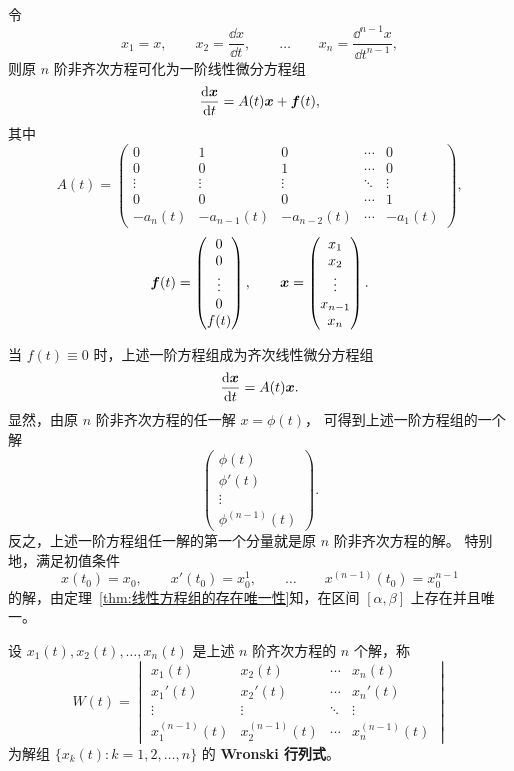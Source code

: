令
\[
	x_1=x,
	\qquad
	x_2=\dfrac{\dd x}{\dd t},
	\qquad\ldots\qquad
	x_n=\dfrac{\dd^{n-1}x}{\dd t^{n-1}},
\]
则原 $n$ 阶非齐次方程可化为一阶线性微分方程组
\[
	\dfrac{\mathrm{d}\boldsymbol{x}}{\mathrm{d} t}
	=A(t)\boldsymbol{x}+\boldsymbol{f}(t),
\]
其中
\[
	A(t)=
	\begin{pmatrix}
		0       & 1          & 0          & \cdots & 0\\
		0       & 0          & 1          & \cdots & 0\\
		\vdots  & \vdots     & \vdots     & \ddots & \vdots\\
		0       & 0          & 0          & \cdots & 1\\
		-a_n(t) & -a_{n-1}(t)& -a_{n-2}(t)& \cdots & -a_1(t)
	\end{pmatrix},
\]
\[
	\boldsymbol{f}(t)=
	\begin{pmatrix}
		0\\
		0\\
		\vdots\\
		0\\
		f(t)
	\end{pmatrix},
	\qquad
	\boldsymbol{x}=
	\begin{pmatrix}
		x_1\\
		x_2\\
		\vdots\\
		x_{n-1}\\
		x_n
	\end{pmatrix}.
\]

当 $f(t)\equiv 0$ 时，上述一阶方程组成为齐次线性微分方程组
\[
	\dfrac{\mathrm{d}\boldsymbol{x}}{\mathrm{d} t}=A(t)\boldsymbol{x}.
\]
显然，由原 $n$ 阶非齐次方程的任一解 $x=\phi(t)$，
可得到上述一阶方程组的一个解
\[
	\begin{pmatrix}
		\phi(t)\\
		\phi'(t)\\
		\vdots\\
		\phi^{(n-1)}(t)
	\end{pmatrix}.
\]
反之，上述一阶方程组任一解的第一个分量就是原 $n$ 阶非齐次方程的解。
特别地，满足初值条件
\[
	x(t_0)=x_0,
	\qquad
	x'(t_0)=x_0^{1},
	\qquad\ldots\qquad
	x^{(n-1)}(t_0)=x_0^{n-1}
\]
的解，由定理~\ref{thm:线性方程组的存在唯一性}知，在区间
$[\alpha,\beta]$ 上存在并且唯一。

\begin{definition}\label{def:高阶线性方程的Wronski行列式}
	设 $x_1(t),x_2(t),\ldots,x_n(t)$ 是上述 $n$ 阶齐次方程的 $n$ 个解，称
	\[
		W(t)=
		\begin{vmatrix}
			x_1(t) & x_2(t) & \cdots & x_n(t)\\
			x_1'(t) & x_2'(t) & \cdots & x_n'(t)\\
			\vdots & \vdots & \ddots & \vdots\\
			x_1^{(n-1)}(t) & x_2^{(n-1)}(t) & \cdots & x_n^{(n-1)}(t)
		\end{vmatrix}
	\]
	为解组 $\{x_k(t):k=1,2,\ldots,n\}$ 的 \textbf{Wronski 行列式}。
\end{definition}


